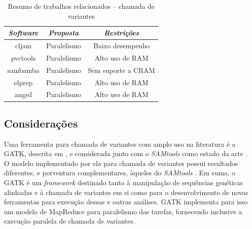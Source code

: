 \documentclass[cic,tc]{iiufrgs}
\begin{document}
\begin{table}[h]
  \caption{Resumo de trabalhos relacionados -- chamada de variantes}
    \centering
        \begin{tabular}{c|c|c}
          \hline
          \textit{Software}  & \textit{Proposta} & \textit{Restrições}  \\
          \hline
          \hline
          cljam     & Paralelismo & Baixo desempenho   \\
          pvctools  & Paralelismo & Alto uso de RAM    \\
          sambamba  & Paralelismo & Sem suporte a CRAM \\
          elprep    & Paralelismo & Alto uso de RAM    \\
          angsd     & Paralelismo & Alto uso de RAM    \\
          \hline
        \end{tabular}
    \label{tbl:calllit}
\end{table}

\subsection{Considerações}
\label{sec:alt}

Uma ferramenta para chamada de variantes com amplo uso na literatura
\cite{de2017gatk} é a GATK, descrita em \cite{mckenna2010genome}, e considerada
junto com o \textit{SAMtools} como estado da
arte \cite{yao2020evaluation} \cite{poplin2018universal}. O modelo implementado
por ela para chamada de variantes possui resultados diferentes, e porventura
complementares, àqueles do
\textit{SAMtools} \cite{gezsi2015variantmetacaller} \cite{hwang2015systematic}. Em suma, o
GATK é um \textit{framework} destinado tanto à manipulação de sequências genéticas
alinhadas e à chamada de variantes em si como para o desenvolvimento de novas
ferramentas para execução dessas e outras análises. GATK implementa para isso
um modelo de MapReduce para paralelismo das tarefas, fornecendo inclusive a
execução paralela de chamada de variantes.

\end{document}
